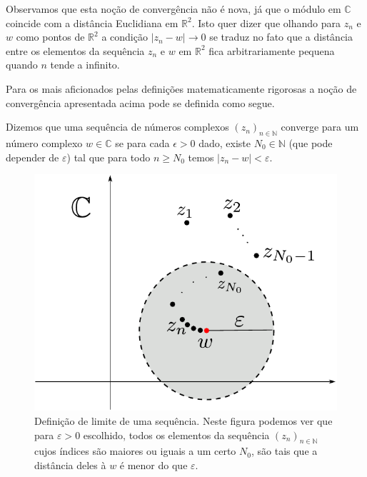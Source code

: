 Observamos que esta noção de convergência não é nova, já que o módulo em $\mathbb{C}$
coincide com a distância Euclidiana em $\mathbb{R}^2$. Isto quer dizer que olhando para 
$z_n$ e $w$ como pontos de $\mathbb{R}^2$ a condição $|z_n-w|\to 0$ se traduz no fato
que a distância entre os elementos da sequência $z_n$ e $w$ em $\mathbb{R}^2$ 
fica arbitrariamente pequena quando $n$ tende a infinito. 

Para os mais aficionados pelas definições matematicamente rigorosas a noção de convergência
apresentada acima pode se definida como segue.

\begin{definicao}\label{def-limite-seq}
Dizemos que uma sequência de números complexos $(z_n)_{n\in\mathbb{N}}$ converge para um número 
complexo $w\in \mathbb{C}$ se para cada $\epsilon>0$ dado, existe $N_0\in\mathbb{N}$ 
(que pode depender de $\varepsilon$) tal que para todo $n\geqslant N_0$ temos 
$|z_n-w|<\varepsilon$. 
\end{definicao}

\begin{figure}[H]
\centering
\includegraphics[scale=0.6]{Figuras/fig-sequencia-convergente}
\caption{Definição de limite de uma sequência. Neste figura podemos ver que para $\varepsilon>0$ escolhido, todos os elementos da sequência $(z_n)_{n\in\mathbb{N}}$ cujos índices são maiores ou iguais a um certo $N_0$, são tais que a distância deles à $w$ é menor do que $\varepsilon$.}
\label{fig-sequencia-cauchy1}
\end{figure}


